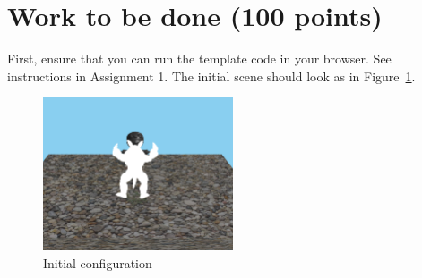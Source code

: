 \documentclass[12pt]{exam}
\begin{document}
\section{Work to be done (100 points)}

First, ensure that you can run the template code in your browser. See
instructions in Assignment 1. The initial scene should look as in Figure~\ref{fig:init}.\\

\begin{figure}[ht]
  \centering
  \includegraphics[width=0.5\textwidth]{./init.png}
    \caption{Initial configuration\label{fig:init}}
\end{figure}
\end{document}
